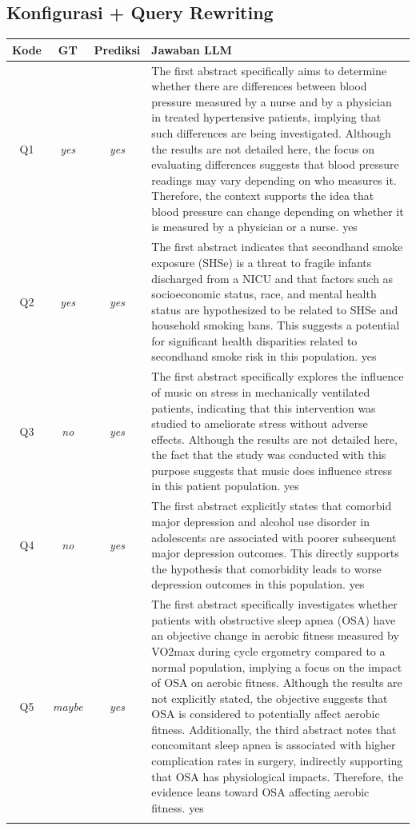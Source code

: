 \subsection*{Konfigurasi + Query Rewriting}
\begin{longtable}{@{}c c c >{\raggedright\arraybackslash}p{8.8cm}@{}}
\toprule
\textbf{Kode} & \textbf{GT} & \textbf{Prediksi} & \textbf{Jawaban LLM} \\
\midrule\endhead
Q1 & \textit{yes} & \textit{yes} & The first abstract specifically aims to determine whether there are differences between blood pressure measured by a nurse and by a physician in treated hypertensive patients, implying that such differences are being investigated. Although the results are not detailed here, the focus on evaluating differences suggests that blood pressure readings may vary depending on who measures it. Therefore, the context supports the idea that blood pressure can change depending on whether it is measured by a physician or a nurse. yes \\
\addlinespace
Q2 & \textit{yes} & \textit{yes} & The first abstract indicates that secondhand smoke exposure (SHSe) is a threat to fragile infants discharged from a NICU and that factors such as socioeconomic status, race, and mental health status are hypothesized to be related to SHSe and household smoking bans. This suggests a potential for significant health disparities related to secondhand smoke risk in this population. yes \\
\addlinespace
Q3 & \textit{no} & \textit{yes} & The first abstract specifically explores the influence of music on stress in mechanically ventilated patients, indicating that this intervention was studied to ameliorate stress without adverse effects. Although the results are not detailed here, the fact that the study was conducted with this purpose suggests that music does influence stress in this patient population. yes \\
\addlinespace
Q4 & \textit{no} & \textit{yes} & The first abstract explicitly states that comorbid major depression and alcohol use disorder in adolescents are associated with poorer subsequent major depression outcomes. This directly supports the hypothesis that comorbidity leads to worse depression outcomes in this population. yes \\
\addlinespace
Q5 & \textit{maybe} & \textit{yes} & The first abstract specifically investigates whether patients with obstructive sleep apnea (OSA) have an objective change in aerobic fitness measured by VO2max during cycle ergometry compared to a normal population, implying a focus on the impact of OSA on aerobic fitness. Although the results are not explicitly stated, the objective suggests that OSA is considered to potentially affect aerobic fitness. Additionally, the third abstract notes that concomitant sleep apnea is associated with higher complication rates in surgery, indirectly supporting that OSA has physiological impacts. Therefore, the evidence leans toward OSA affecting aerobic fitness. yes \\
\addlinespace
\bottomrule
\end{longtable}

